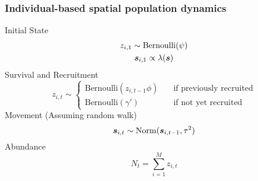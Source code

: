 \documentclass[color=usenames,dvipsnames]{beamer}\usepackage[]{graphicx}\usepackage[]{color}
\begin{document}




\begin{frame}
  \frametitle{\Large Individual-based spatial population dynamics}
  {Initial State}
  \begin{gather*}
    z_{i,1} \sim \mbox{Bernoulli}(\psi) \\
    {\bm s}_{i,1} \propto \lambda({\bm s})
  \end{gather*}
  \vfill
  Survival and Recruitment
  \[
    z_{i,t} \sim
    \begin{cases}
      \mbox{Bernoulli}(z_{i,t-1}\phi) & \quad \text{if previously recruited} \\
      \mbox{Bernoulli}(\gamma') & \quad \text{if not yet recruited} 
    \end{cases}
  \]
  \vfill
  Movement (Assuming random walk)
  \[
    {\bm s}_{i,t} \sim \mathrm{Norm}({\bm s}_{i,t-1}, \tau^2)  
  \]
  \vfill
  Abundance
  \[
    N_t = \sum_{i=1}^M z_{i,t}
  \]
\end{frame}
\end{document}
